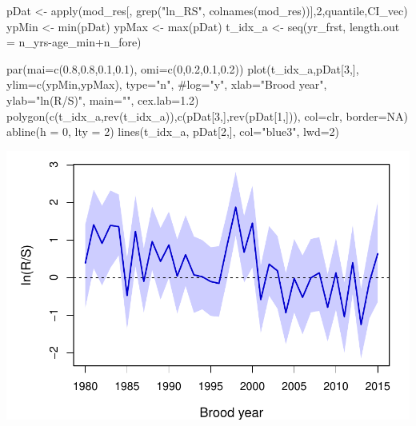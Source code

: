 \documentclass[11pt,]{article}
\newenvironment{Shaded}{}{}
\newcommand{\KeywordTok}[1]{\textcolor[rgb]{0.00,0.00,1.00}{#1}}
\newcommand{\DataTypeTok}[1]{#1}
\newcommand{\DecValTok}[1]{#1}
\newcommand{\FloatTok}[1]{#1}
\newcommand{\StringTok}[1]{\textcolor[rgb]{0.00,0.50,0.50}{#1}}
\newcommand{\CommentTok}[1]{\textcolor[rgb]{0.00,0.50,0.00}{#1}}
\newcommand{\OtherTok}[1]{\textcolor[rgb]{1.00,0.25,0.00}{#1}}
\newcommand{\OperatorTok}[1]{#1}
\newcommand{\NormalTok}[1]{#1}
\begin{document}
\begin{Shaded}
\begin{Highlighting}[]
\NormalTok{pDat <-}\StringTok{ }\KeywordTok{apply}\NormalTok{(mod_res[, }\KeywordTok{grep}\NormalTok{(}\StringTok{"ln_RS"}\NormalTok{, }\KeywordTok{colnames}\NormalTok{(mod_res))],}\DecValTok{2}\NormalTok{,quantile,CI_vec)}
\NormalTok{ypMin <-}\StringTok{ }\KeywordTok{min}\NormalTok{(pDat)}
\NormalTok{ypMax <-}\StringTok{ }\KeywordTok{max}\NormalTok{(pDat)}
\NormalTok{t_idx_a <-}\StringTok{ }\KeywordTok{seq}\NormalTok{(yr_frst, }\DataTypeTok{length.out =}\NormalTok{ n_yrs}\OperatorTok{-}\NormalTok{age_min}\OperatorTok{+}\NormalTok{n_fore)}

\KeywordTok{par}\NormalTok{(}\DataTypeTok{mai=}\KeywordTok{c}\NormalTok{(}\FloatTok{0.8}\NormalTok{,}\FloatTok{0.8}\NormalTok{,}\FloatTok{0.1}\NormalTok{,}\FloatTok{0.1}\NormalTok{), }\DataTypeTok{omi=}\KeywordTok{c}\NormalTok{(}\DecValTok{0}\NormalTok{,}\FloatTok{0.2}\NormalTok{,}\FloatTok{0.1}\NormalTok{,}\FloatTok{0.2}\NormalTok{))}
\KeywordTok{plot}\NormalTok{(t_idx_a,pDat[}\DecValTok{3}\NormalTok{,], }\DataTypeTok{ylim=}\KeywordTok{c}\NormalTok{(ypMin,ypMax), }\DataTypeTok{type=}\StringTok{"n"}\NormalTok{, }\CommentTok{#log="y",}
     \DataTypeTok{xlab=}\StringTok{"Brood year"}\NormalTok{, }\DataTypeTok{ylab=}\StringTok{"ln(R/S)"}\NormalTok{, }\DataTypeTok{main=}\StringTok{""}\NormalTok{, }\DataTypeTok{cex.lab=}\FloatTok{1.2}\NormalTok{)}
\KeywordTok{polygon}\NormalTok{(}\KeywordTok{c}\NormalTok{(t_idx_a,}\KeywordTok{rev}\NormalTok{(t_idx_a)),}\KeywordTok{c}\NormalTok{(pDat[}\DecValTok{3}\NormalTok{,],}\KeywordTok{rev}\NormalTok{(pDat[}\DecValTok{1}\NormalTok{,])), }\DataTypeTok{col=}\NormalTok{clr, }\DataTypeTok{border=}\OtherTok{NA}\NormalTok{)}
\KeywordTok{abline}\NormalTok{(}\DataTypeTok{h =} \DecValTok{0}\NormalTok{, }\DataTypeTok{lty =} \DecValTok{2}\NormalTok{)}
\KeywordTok{lines}\NormalTok{(t_idx_a, pDat[}\DecValTok{2}\NormalTok{,], }\DataTypeTok{col=}\StringTok{"blue3"}\NormalTok{, }\DataTypeTok{lwd=}\DecValTok{2}\NormalTok{)}
\end{Highlighting}
\end{Shaded}

\includegraphics{App_3_Summarize_results_files/figure-latex/plot_obsProd_over_time-1.pdf}
\end{document}
